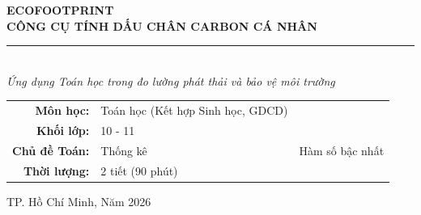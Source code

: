 \documentclass[12pt,a4paper]{article}
\begin{document}
\begin{titlepage}

\vspace{3cm}
\begin{center}
    {\Huge\bfseries\sffamily\color{primary} ECOFOOTPRINT}\\[1cm]
    {\LARGE\bfseries\sffamily CÔNG CỤ TÍNH DẤU CHÂN CARBON CÁ NHÂN}\\[0.5cm]
    \rule{0.6\textwidth}{2pt}\\[1cm]
    {\Large\itshape\sffamily Ứng dụng Toán học trong đo lường phát thải và bảo vệ môi trường}\\[2cm]

    \begin{tcolorbox}[width=0.7\textwidth, colback=bgsoft, colframe=primary, arc=5mm]
        \centering
        \large\sffamily
        \begin{tabular}{rl}
            \textbf{Môn học:} & Toán học (Kết hợp Sinh học, GDCD) \\
            \textbf{Khối lớp:} & 10 - 11 \\
            \textbf{Chủ đề Toán:} & Thống kê & Hàm số bậc nhất \\
            \textbf{Thời lượng:} & 2 tiết (90 phút) \\
        \end{tabular}
    \end{tcolorbox}
    
    \vfill
    {\large\sffamily TP. Hồ Chí Minh, Năm 2026}
\end{center}
\end{titlepage}

\tableofcontents
\newpage

\end{document}
